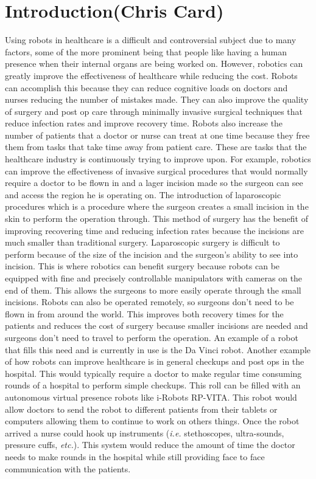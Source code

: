 \documentclass[11pt,conference]{IEEEtran}
\begin{document}
\section{Introduction(Chris Card)}

Using robots in healthcare is a difficult and controversial subject due to many factors, some of the more prominent being that people like having a human presence when their internal organs are being worked on.  However, robotics can greatly improve the effectiveness of healthcare while reducing the cost.  Robots can accomplish this because they can reduce cognitive loads on doctors and nurses reducing the number of mistakes made.  They can also improve the quality of surgery and post op care through minimally invasive surgical techniques that reduce infection rates and improve recovery time.  Robots also increase the number of patients that a doctor or nurse can treat at one time because they free them from tasks that take time away from patient care.  These are tasks that the healthcare industry is continuously trying to improve upon.
\newline
\indent For example, robotics can improve the effectiveness of invasive surgical procedures that would normally require a doctor to be flown in and a lager incision made so the surgeon can see and access the region he is operating on.  The introduction of laparoscopic procedures which is a procedure where the surgeon creates a small incision in the skin to perform the operation through.  This method of surgery has the benefit of improving recovering time and reducing infection rates because the incisions are much smaller than traditional surgery.  Laparoscopic surgery is difficult to perform because of the size of the incision and the surgeon’s ability to see into incision.  This is where robotics can benefit surgery because robots can be equipped with fine and precisely controllable manipulators with cameras on the end of them.  This allows the surgeons to more easily operate through the small incisions.  Robots can also be operated remotely, so surgeons don’t need to be flown in from around the world.  This improves both recovery times for the patients and reduces the cost of surgery because smaller incisions are needed and surgeons don’t need to travel to perform the operation.  An example of a robot that fills this need and is currently in use is the Da Vinci robot.
\newline
\indent Another example of how robots can improve healthcare is in general checkups and post ops in the hospital.  This would typically require a doctor to make regular time consuming rounds of a hospital to perform simple checkups.  This roll can be filled with an autonomous virtual presence robots like i-Robots RP-VITA.  This robot would allow doctors to send the robot to different patients from their tablets or computers allowing them to continue to work on others things.  Once the robot arrived a nurse could hook up instruments (\textit{i.e.} stethoscopes, ultra-sounds, pressure cuffs, \textit{etc.}).  This system would reduce the amount of time the doctor needs to make rounds in the hospital while still providing face to face communication with the patients.
\end{document}
